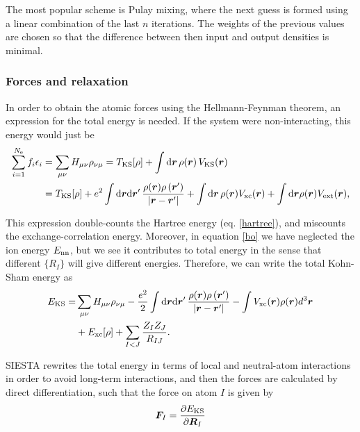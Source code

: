 The most popular scheme is Pulay mixing\parencite{Pulay1980, Pulay1982}, where the next guess is formed using a linear combination of the last \(n\) iterations. The weights of the previous values are chosen so that the difference between then input and output densities is minimal.

\subsubsection*{Forces and relaxation}
In order to obtain the atomic forces using the Hellmann-Feynman theorem\parencite{Feynman1939}, an expression for the total energy is needed. If the system were non-interacting, this energy would just be
\begin{equation}
\begin{split}
\sum_{i=1}^{N_{\mathrm{e}}}f_i \epsilon_{i} &=\sum_{\mu \nu} H_{\mu \nu} \rho_{\nu \mu}=T_{\mathrm{KS}}[\rho]+\int \mathrm{d} \bm{r}\, \rho(\bm{r})\, V_{\mathrm{KS}}(\bm{r}) \\
&=T_{\mathrm{KS}}[\rho]+e^2\int \mathrm{d} \bm{r} \mathrm{d} \bm{r}^{\prime}\, \frac{\rho(\bm{r}) \rho\left(\bm{r}^{\prime}\right)}{\left|\bm{r}-\bm{r}^{\prime}\right|}+\int \mathrm{d} \bm{r}\, \rho(\bm{r}) V_{\mathrm{x c}}(\bm{r})+\int \mathrm{d} \bm{r} \rho(\bm{r}) V_{\mathrm{ext}}(\bm{r}),
\end{split}
\end{equation}

This expression double-counts the Hartree energy (eq. \ref{hartree}), and miscounts the exchange-correlation energy. Moreover, in equation \ref{bo} we have neglected the ion energy \(E_{\mathrm{nn}}\), but we see it contributes to total energy in the sense that different \(\{R_I\}\) will give different energies. Therefore, we can write the total Kohn-Sham energy as
\begin{equation}
\begin{split}
E_{\mathrm{KS}} =&\sum_{\mu \nu} H_{\mu \nu} \rho_{\nu \mu}-\frac{e^2}{2}\int \mathrm{d} \bm{r} \mathrm{d} \bm{r}^{\prime}\, \frac{\rho(\bm{r}) \rho\left(\bm{r}^{\prime}\right)}{\left|\bm{r}-\bm{r}^{\prime}\right|} -\int V_{\mathrm{xc}}(\bm{r}) \rho(\bm{r}) d^{3} \bm{r}\\
&+ E_{\mathrm{xc}}[\rho]+\sum_{I<J} \frac{Z_{I} Z_{J}}{R_{I J}}.
\end{split}
\end{equation}

SIESTA rewrites the total energy in terms of local and neutral-atom interactions in order to avoid long-term interactions, and then the forces are calculated by direct differentiation, such that the force on atom \(I\) is given by
\begin{equation}
\bm F_I=\frac{\partial{E_{\mathrm{KS}}}}{\partial{\bm R_I}}
\end{equation}

